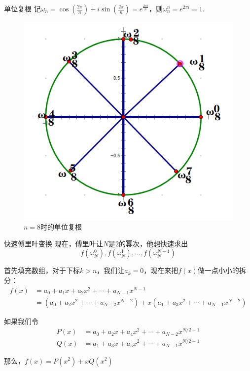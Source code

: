 \documentclass{beamer}
\begin{document}
\begin{frame}{单位复根}
    记$\omega_n=\cos\left(\frac{2\pi}{n}\right)+i\sin\left(\frac{2\pi}{n}\right)=e^{\frac{2\pi i}{n}}$，则$\omega_n^n=e^{2\pi i}=1$.

    \begin{figure}
        \centering
        \includegraphics[width=0.5\linewidth]{pic/unitroot.png}
        \caption{$n=8$时的单位复根}
    \end{figure}
\end{frame}

\begin{frame}{快速傅里叶变换}
    现在，傅里叶让$N$是$2$的幂次，他想快速求出
    \begin{equation*}
        f(\omega_N^0),f(\omega_N^1),...,f(\omega_N^{N-1})
    \end{equation*}

    \pause
    首先填充数组，对于下标$k>n$，我们让$a_k=0$，现在来把$f(x)$做一点小小的拆分：
    \begin{align*}
        f(x)&=a_0 + a_1x+ a_2x^2 + \cdots + a_{N-1}x^{N-1}\\
        &= (a_0+a_2x^2+\cdots + a_{N-2}x^{N-2}) + x(a_1+a_3x^2+\cdots + a_{N-1}x^{N-2})
    \end{align*}

    \pause
    如果我们令
    \begin{align*}
        P(x)&= a_0+a_2x+ a_4x^2 + \cdots + a_{N-2}x^{N/2-1}\\
        Q(x)&= a_1+a_3x+ a_5x^2 + \cdots + a_{N-1}x^{N/2-1}
    \end{align*}

    \pause
    那么，$f(x)=P(x^2)+xQ(x^2)$
\end{frame}
\end{document}
